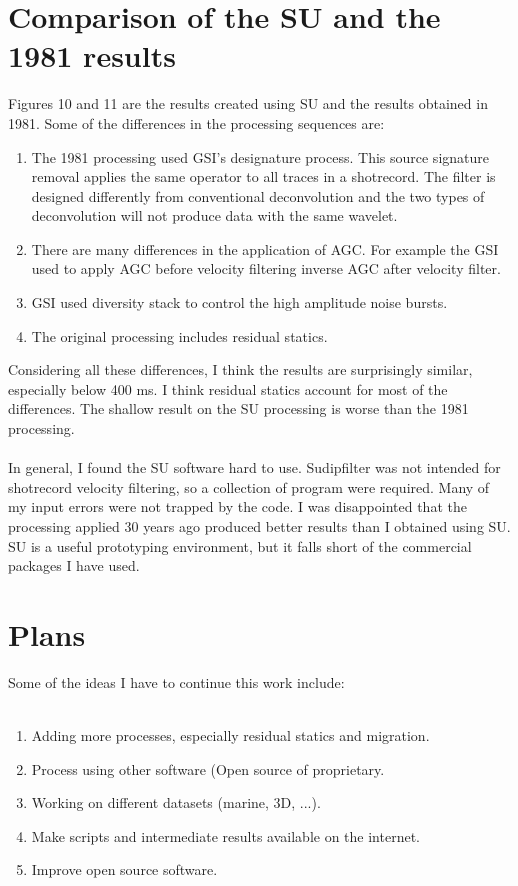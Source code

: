 \section{Comparison of the SU and the 1981 results}
Figures 10 and 11 are the results created using SU and the results obtained in 1981.  Some of the differences in the processing sequences are:\\
\begin{enumerate}
\item The 1981 processing used GSI's designature process.  This source signature removal applies the same operator to all traces in a shotrecord.  The filter is designed differently from conventional deconvolution and the two types of deconvolution will not produce data with the same wavelet. 
\item There are many differences in the application of AGC.  For example the GSI used to apply AGC before velocity filtering 
inverse AGC after velocity filter.
\item GSI used diversity stack to control the high amplitude noise bursts.
\item The original processing includes residual statics.
\end{enumerate}
Considering all these differences, I think the results are surprisingly similar, especially below 400 ms.  I think residual statics account for most of the differences.  The shallow result on the SU processing is worse than the 1981 processing.\\
\\
In general, I found the SU software hard to use.  Sudipfilter was not intended for shotrecord velocity filtering, so a collection of program were required.  Many of my input errors were not trapped by the code.  I was disappointed that the processing applied 30 years ago produced better results than I obtained using SU.  SU is a useful prototyping environment, but it falls short of the commercial packages I have used.\\


\section{Plans}
Some of the ideas I have to continue this work include:\\
\\
\begin{enumerate}
\item Adding more processes, especially residual statics and migration.\\
\item Process using other software (Open source of proprietary. 
\item Working on different datasets (marine, 3D, ...).\\
\item Make scripts and intermediate results available on the internet.\\
\item Improve open source software.\\
\end{enumerate}

